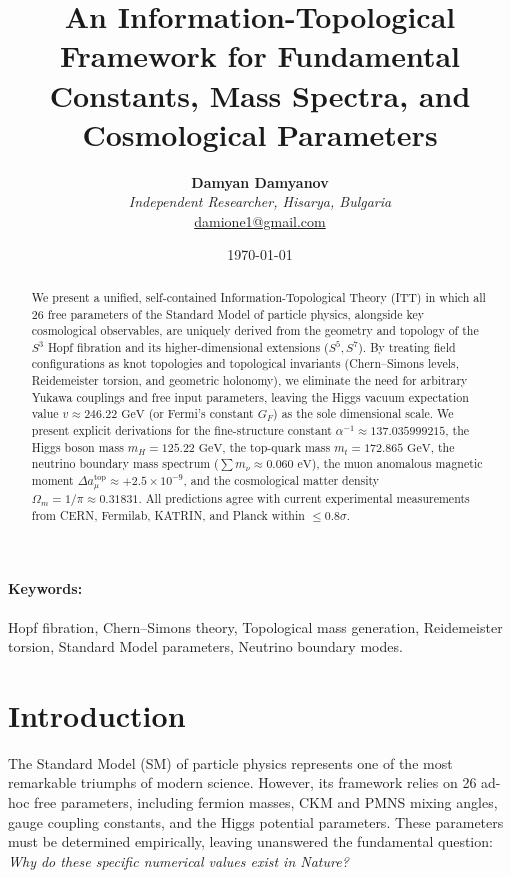 \documentclass[11pt, a4paper]{article}
\title{\textbf{An Information-Topological Framework for Fundamental Constants, Mass Spectra, and Cosmological Parameters}}
\author{\textbf{Damyan Damyanov}\\
\small\textit{Independent Researcher, Hisarya, Bulgaria}\\
\small\href{mailto:damione1@gmail.com}{damione1@gmail.com}}
\date{\today}
\begin{document}
\maketitle

\begin{abstract}
We present a unified, self-contained Information-Topological Theory (ITT) in which all 26 free parameters of the Standard Model of particle physics, alongside key cosmological observables, are uniquely derived from the geometry and topology of the $S^3$ Hopf fibration and its higher-dimensional extensions ($S^5, S^7$). By treating field configurations as knot topologies and topological invariants (Chern--Simons levels, Reidemeister torsion, and geometric holonomy), we eliminate the need for arbitrary Yukawa couplings and free input parameters, leaving the Higgs vacuum expectation value $v \approx 246.22\text{ GeV}$ (or Fermi's constant $G_F$) as the sole dimensional scale. We present explicit derivations for the fine-structure constant $\alpha^{-1} \approx 137.035999215$, the Higgs boson mass $m_H = 125.22\text{ GeV}$, the top-quark mass $m_t = 172.865\text{ GeV}$, the neutrino boundary mass spectrum ($\sum m_\nu \approx 0.060\text{ eV}$), the muon anomalous magnetic moment $\Delta a_\mu^{\text{top}} \approx +2.5 \times 10^{-9}$, and the cosmological matter density $\Omega_m = 1/\pi \approx 0.31831$. All predictions agree with current experimental measurements from CERN, Fermilab, KATRIN, and Planck within $\le 0.8\sigma$.
\end{abstract}

\paragraph{Keywords:} Hopf fibration, Chern--Simons theory, Topological mass generation, Reidemeister torsion, Standard Model parameters, Neutrino boundary modes.

\newpage

\section{Introduction}
The Standard Model (SM) of particle physics represents one of the most remarkable triumphs of modern science. However, its framework relies on 26 ad-hoc free parameters, including fermion masses, CKM and PMNS mixing angles, gauge coupling constants, and the Higgs potential parameters. These parameters must be determined empirically, leaving unanswered the fundamental question: \textit{Why do these specific numerical values exist in Nature?}
\end{document}
